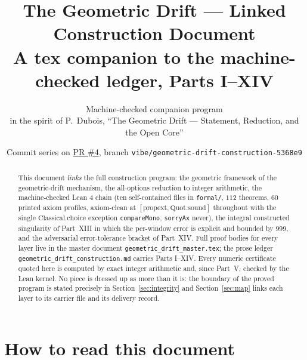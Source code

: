 \documentclass[11pt]{article}
\title{The Geometric Drift --- Linked Construction Document\\
\large A tex companion to the machine-checked ledger, Parts I--XIV}
\author{Machine-checked companion program\\ \small in the spirit of P.~Dubois, ``The Geometric Drift --- Statement, Reduction, and the Open Core''}
\date{Commit series on \href{https://github.com/duboispaulihp-sys/pauldubois/pull/4}{PR \#4}, branch \texttt{vibe/geometric-drift-construction-5368e9}}
\begin{document}
\maketitle

\begin{abstract}
This document \emph{links} the full construction program: the geometric framework of the
geometric-drift mechanism, the all-options reduction to integer arithmetic, the machine-checked
Lean 4 chain (ten self-contained files in \texttt{formal/}, $112$ theorems, $60$ printed axiom
profiles, axiom-clean at
$[\mathrm{propext},\mathrm{Quot.sound}]$ throughout with the single
$\mathrm{Classical.choice}$ exception \texttt{compareMono}, \texttt{sorryAx} never), the
integral
constructed singularity of Part~XIII in which the per-window error is explicit and bounded by
$999$, and the adversarial error-tolerance bracket of Part~XIV. Full proof bodies for every
layer live in the master document \texttt{geometric\_drift\_master.tex}; the prose ledger
\texttt{geometric\_drift\_construction.md} carries Parts I--XIV. Every numeric certificate
quoted here is computed by exact integer arithmetic and, since
Part~V, checked by the Lean kernel. No piece is dressed up as more than it is: the boundary
of the proved program is stated precisely in Section~\ref{sec:integrity} and
Section~\ref{sec:map} links each layer to its carrier file and its delivery record.
\end{abstract}

\section{How to read this document}\label{sec:readme}
\end{document}
